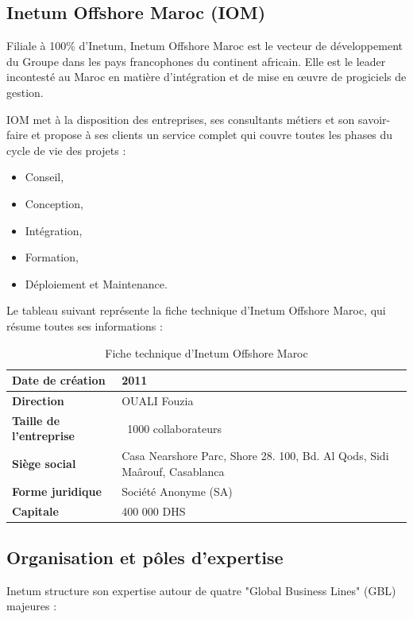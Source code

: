 \subsection{Inetum Offshore Maroc (IOM)}
Filiale à 100\% d'Inetum, Inetum Offshore Maroc est le vecteur de développement du Groupe dans les pays francophones du continent africain. Elle est le leader incontesté au Maroc en matière d’intégration et de mise en œuvre de progiciels de gestion. 

IOM met à la disposition des entreprises, ses consultants métiers et son
savoir-faire et propose à ses clients un service complet qui couvre toutes les phases du
cycle de vie des projets :
\begin{itemize}
    \setlength\itemsep{0.1em}  %
    \setlength\parskip{0pt}    %
    \setlength\parsep{0pt}     %
    \item[---] Conseil,
    \item[---] Conception,
    \item[---] Intégration,
    \item[---] Formation,
    \item[---] Déploiement et Maintenance.
\end{itemize}

Le tableau suivant représente la fiche technique d’Inetum Offshore Maroc, qui résume toutes ses informations :
\begin{table}[H]
    \centering
    \renewcommand{\arraystretch}{1.3}
    \begin{tabular}{|l|p{9cm}|}
        \hline
        \textbf{Date de création} & 2011 \\ \hline
        \textbf{Direction} & OUALI Fouzia \\ \hline
        \textbf{Taille de l’entreprise} & ~1000 collaborateurs \\ \hline
        \textbf{Siège social} & Casa Nearshore Parc, Shore 28. 100, Bd. Al Qods, Sidi Maârouf, Casablanca \\ \hline
        \textbf{Forme juridique} & Société Anonyme (SA) \\ \hline
        \textbf{Capitale} & 400 000 DHS \\ \hline
    \end{tabular}
    \caption{Fiche technique d’Inetum Offshore Maroc}
    \label{tab:fiche_iom}
\end{table}

\subsection{Organisation et pôles d'expertise}
Inetum structure son expertise autour de quatre "Global Business Lines" (GBL) majeures :

